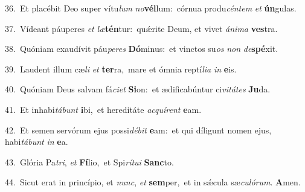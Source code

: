{\numbfont\textcolor{\numbcolor}{36.}}~Et placébit Deo super vítu\textit{lum} \textit{no}\-\textbf{vél}lum:~\star córnua produ\-\textit{cén}\-\textit{tem} \textit{et} \textbf{ún}\-gulas.\par
{\numbfont\textcolor{\numbcolor}{37.}}~Vídeant páuperes \textit{et} \textit{læ}\-\textbf{tén}tur:~\star quǽrite Deum, et vivet \textit{á}\-\textit{ni}\textit{ma} \textbf{ves}\-tra.\par
{\numbfont\textcolor{\numbcolor}{38.}}~Quóniam exaudívit páu\-\textit{pe}\-\textit{res} \textbf{Dó}\-minus:~\star et vinctos su\textit{os} \textit{non} \textit{de}\-\textbf{spé}xit.\par
{\numbfont\textcolor{\numbcolor}{39.}}~Laudent illum cæ\textit{li} \textit{et} \textbf{ter}\-ra,~\star mare et ómnia reptí\-\textit{li}\-\textit{a} \textit{in} \textbf{e}\-is.\par
{\numbfont\textcolor{\numbcolor}{40.}}~Quóniam Deus salvam fá\-\textit{ci}\-\textit{et} \textbf{Si}\-on:~\star et ædificabúntur ci\-\textit{vi}\-\textit{tá}\textit{tes} \textbf{Ju}\-da.\par
{\numbfont\textcolor{\numbcolor}{41.}}~Et inhabi\-\textit{tá}\-\textit{bunt} \textbf{i}\-bi,~\star et hereditáte \textit{ac}\-\textit{quí}\textit{rent} \textbf{e}\-am.\par
{\numbfont\textcolor{\numbcolor}{42.}}~Et semen servórum ejus possi\-\textit{dé}\-\textit{bit} \textbf{e}\-am:~\star et qui díligunt nomen ejus, habi\-\textit{tá}\-\textit{bunt} \textit{in} \textbf{e}\-a.\par
{\numbfont\textcolor{\numbcolor}{43.}}~Glória Pa\-\textit{tri}\-, \textit{et} \textbf{Fí}\-lio,~\star et Spi\-\textit{rí}\-\textit{tu}\textit{i} \textbf{Sanc}\-to.\par
{\numbfont\textcolor{\numbcolor}{44.}}~Sicut erat in princípio, et \textit{nunc}\-, \textit{et} \textbf{sem}\-per,~\star et in sǽcula sæ\-\textit{cu}\-\textit{ló}\textit{rum}. \textbf{A}\-men.\par
